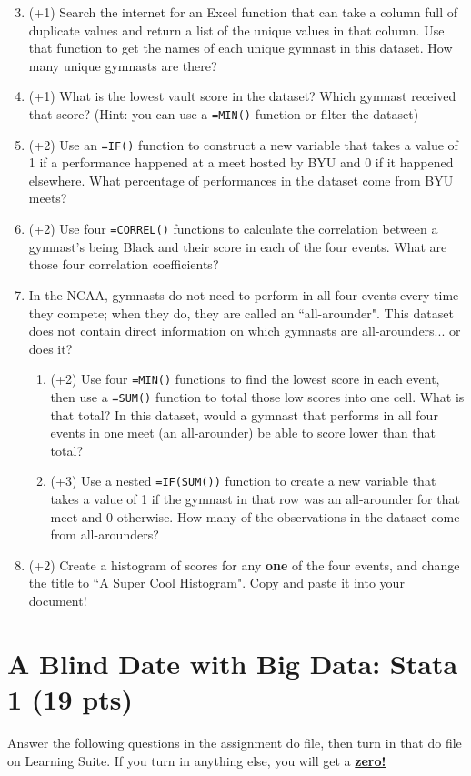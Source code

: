 \documentclass[12pt, oneside]{article}
\begin{document}
\begin{enumerate}
\setcounter{enumi}{2}
\item   (+1)    Search the internet for an Excel function that can take a column full of duplicate values and return a list of the unique values in that column. Use that function to get the names of each unique gymnast in this dataset. How many unique gymnasts are there?
\item	(+1)	What is the lowest vault score in the dataset?  Which gymnast received that score? (Hint: you can use a \texttt{=MIN()} function or filter the dataset)
\item	(+2)	Use an \texttt{=IF()} function to construct a new variable that takes a value of 1 if a performance happened at a meet hosted by BYU and 0 if it happened elsewhere. What percentage of performances in the dataset come from BYU meets?
\item   (+2)    Use four \texttt{=CORREL()} functions to calculate the correlation between a gymnast's being Black and their score in each of the four events. What are those four correlation coefficients?
\item	In the NCAA, gymnasts do not need to perform in all four events every time they compete; when they do, they are called an ``all-arounder". This dataset does not contain direct information on which gymnasts are all-arounders... or does it?
\begin{enumerate}
\item	(+2)	Use four \texttt{=MIN()} functions to find the lowest score in each event, then use a \texttt{=SUM()} function to total those low scores into one cell. What is that total? In this dataset, would a gymnast that performs in all four events in one meet (an all-arounder) be able to score lower than that total? 
\item	(+3)	Use a nested \texttt{=IF(SUM())} function to create a new variable that takes a value of 1 if the gymnast in that row was an all-arounder for that meet and 0 otherwise. How many of the observations in the dataset come from all-arounders?
\end{enumerate}
\item   (+2)    Create a histogram of scores for any \textbf{one} of the four events, and change the title to ``A Super Cool Histogram". Copy and paste it into your document!
\end{enumerate}


\newpage
\section{A Blind Date with Big Data: Stata 1 (19 pts)}
Answer the following questions in the assignment do file, then turn in that do file on Learning Suite. If you turn in anything else, you will get a \underline{\textbf{zero!}}
\end{document}
